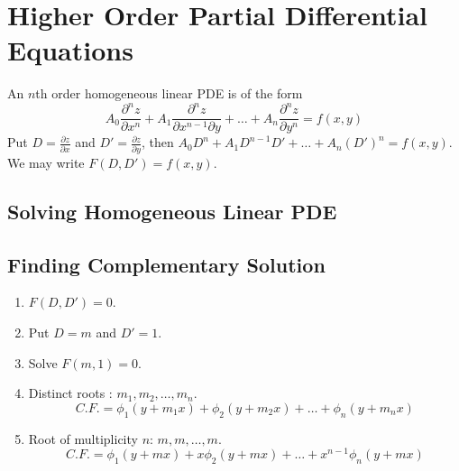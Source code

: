 \chapter{Higher Order Partial Differential Equations}
\begin{definition}
An $n$th order homogeneous linear PDE is of the form
$$A_0 \frac{\partial^n z}{\partial x^n} + A_1 \frac{\partial^n z}{\partial x^{n-1} \partial y} + \dots + A_n \frac{\partial^n z}{\partial y^n} = f(x,y)$$
Put $D = \frac{\partial z}{\partial x}$ and $D' = \frac{\partial z}{\partial y}$, then $A_0D^n + A_1D^{n-1}D' + \dots + A_n (D')^n = f(x,y)$. We may write $F(D,D') = f(x,y)$.
\end{definition}

\section{Solving Homogeneous Linear PDE}
\section{Finding Complementary Solution}
\begin{enumerate}
	\item $F(D,D') = 0$.
	\item Put $D = m$ and $D' =1$.
	\item Solve $F(m,1) = 0$.
	\item Distinct roots : $m_1,m_2,\dots,m_n$.
	$$C.F. = \phi_1(y+m_1x) + \phi_2(y+m_2x) + \dots + \phi_n(y+m_nx)$$
	\item Root of multiplicity $n$: $m,m,\dots,m$.
	$$C.F. = \phi_1(y+mx) + x\phi_2(y+mx) + \dots + x^{n-1}\phi_n(y+mx)$$
\end{enumerate}
